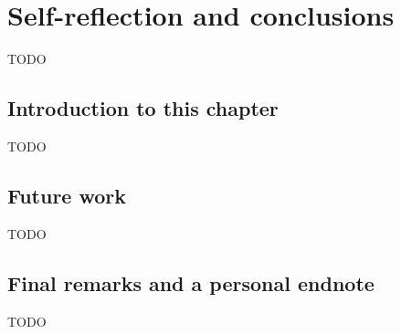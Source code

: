 



\chapter{Self-reflection and conclusions}
\label{ch:discussion}
TODO

\section{Introduction to this chapter}
\label{sec:discussion_introduction}

TODO

\section{Future work}
\label{sec:discussion_final_remarks}

TODO

\section{Final remarks and a personal endnote}
\label{sec:discussion_final_remarks}

TODO
